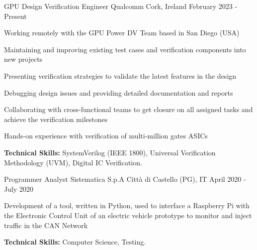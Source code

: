 

\begin{cventries}

  \cventry
    {GPU Design Verification Engineer} %
    {Qualcomm} %
    {Cork, Ireland} %
    {February 2023 - Present} %
    {
      \begin{cvitems} %
        \item {Working remotely with the GPU Power DV Team based in San Diego (USA)}
        \item {Maintaining and improving existing test cases and verification components into new projects}
        \item {Presenting verification strategies to validate the latest features in the design}
        \item {Debugging design issues and providing detailed documentation and reports}
        \item {Collaborating with cross-functional teams to get closure on all assigned tasks and achieve the verification milestones}
        \item {Hands-on experience with verification of multi-million gates ASICs}
        \item {\textbf{Technical Skills:} SystemVerilog (IEEE 1800), Universal Verification Methodology (UVM), Digital IC Verification.}
      \end{cvitems}
    }

  \cventry
    {Programmer Analyst} %
    {Sistematica S.p.A} %
    {Città di Castello (PG), IT} %
    {April 2020 - July 2020} %
    {
      \begin{cvitems} %
        \item {Development of a tool, written in Python, used to interface a Raspberry Pi with the Electronic Control Unit of an electric vehicle prototype to monitor and inject traffic in the CAN Network}
        \item {\textbf{Technical Skills:} Computer Science, Testing.}
      \end{cvitems}
    }


\end{cventries}
